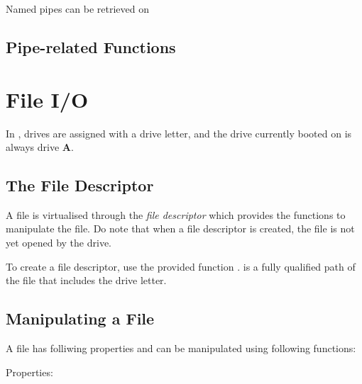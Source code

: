 Named pipes can be retrieved on 

\section{Pipe-related Functions}

\begin{outline}
\1
\1
\1
\1
\1
\1
\end{outline}


\chapter{File I/O}
In \thedos, drives are assigned with a drive letter, and the drive currently booted on is always drive \textbf{A}.


\section{The File Descriptor}
A file is virtualised through the \emph{file descriptor} which provides the functions to manipulate the file. Do note that when a file descriptor is created, the file is not yet opened by the drive.

To create a file descriptor, use the provided function .  is a fully qualified path of the file that includes the drive letter.

\section{Manipulating a File}
A file has folliwing properties and can be manipulated using following functions:

Properties:


